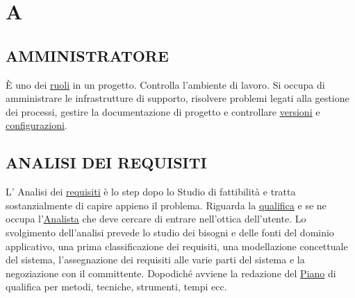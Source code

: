 

	\section{A} \label{sec:A} 
		
		\subsection{AMMINISTRATORE}  \label{amministratore}
		È uno dei \underline{\hyperref[ruoli]{ruoli}} in un progetto. Controlla l'ambiente di lavoro. Si occupa di amministrare le infrastrutture di supporto, risolvere problemi legati alla gestione dei processi, gestire la documentazione di progetto e controllare \underline{\hyperref[versione]{versioni}} e \underline{\hyperref[configurazione]{configurazioni}}.
		
		\subsection{ANALISI DEI REQUISITI}  \label{analisideirequisiti} %
		L' Analisi dei \underline{\hyperref[requirements]{requisiti}} è lo step dopo lo Studio di fattibilità e tratta sostanzialmente di capire appieno il problema. Riguarda la \underline{\hyperref[qualifica]{qualifica}} e se ne occupa l'\underline{\hyperref[analista]{Analista}} che deve cercare di entrare nell'ottica dell'utente. Lo svolgimento dell'analisi prevede lo studio dei bisogni e delle fonti del dominio applicativo, una prima classificazione dei requisiti, una modellazione concettuale del sistema, l'assegnazione dei requisiti alle varie parti del sistema e la negoziazione con il committente. Dopodiché avviene la redazione del \underline{\hyperref[piano]{Piano}} di qualifica per metodi, tecniche, strumenti, tempi ecc. \\
		
